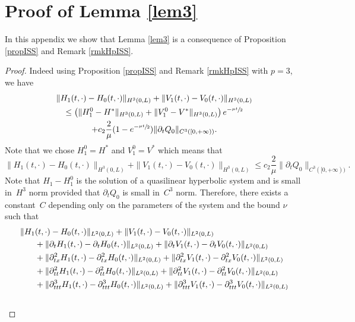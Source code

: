 \documentclass[11pt]{article}
\numberwithin{equation}{section}
\theoremstyle{definition}
\begin{document}
\section{Proof of Lemma \ref{lem3}}\label{app:prooflem3}
In this appendix we show that Lemma \ref{lem3} is a consequence of Proposition \ref{propISS} and Remark \ref{rmkHpISS}.
\begin{proof}
Indeed using Proposition \ref{propISS} and Remark \ref{rmkHpISS} with $p=3$, we have
\begin{multline*}
\|H_{1}(t,\cdot)-H_{0}(t,\cdot)\|_{H^{3}(0,L)}+\|V_{1}(t,\cdot)-V_{0}(t,\cdot)\|_{H^{3}(0,L)}\\
\leq \left(\|H_{1}^{0}-H^{*}\|_{H^{3}(0,L)}+\|V_{1}^{0}-V^{*}\|_{H^{3}(0,L)}\right)e^{-\sfrac{\mu t}{2}}\\
+c_{2} \frac{2}{\mu}(1-e^{-\sfrac{\mu t}{2}}) \|\partial_{t}Q_{0}\|_{C^{3}([0,+\infty))}.
\end{multline*}
Note that we chose $H_{1}^{0} = H^{*}$ and $V_{1}^{0} = V^{*}$ which means that
\begin{equation}\label{estimlemma1}
\|H_{1}(t,\cdot)-H_{0}(t,\cdot)\|_{H^{3}(0,L)}+\|V_{1}(t,\cdot)-V_{0}(t,\cdot)\|_{H^{3}(0,L)}\leq c_{2} \frac{2}{\mu}\|\partial_{t}Q_{0}\|_{C^{3}([0,+\infty))}.
\end{equation}
Note that $H_{1}-H_{1}^{0}$ is the solution of a quasilinear hyperbolic system and is small in~$H^{3}$ norm provided that $\partial_{t}Q_{0}$ is small in~$C^{3}$ norm. Therefore, there exists a constant~$C$ depending only on the parameters of the system and the bound $\nu$ such that
\begin{align}
\label{estimlemma2}
\|H_{1}&(t,\cdot)-H_{0}(t,\cdot)\|_{L^{2}(0,L)}+\|V_{1}(t,\cdot)-V_{0}(t,\cdot)\|_{L^{2}(0,L)}\\\notag
&+\|\partial_{t}H_{1}(t,\cdot)-\partial_{t}H_{0}(t,\cdot)\|_{L^{2}(0,L)}+\|\partial_{t}V_{1}(t,\cdot)-\partial_{t}V_{0}(t,\cdot)\|_{L^{2}(0,L)}\\\notag
&+\|\partial_{tx}^{2}H_{1}(t,\cdot)-\partial_{tx}^{2}H_{0}(t,\cdot)\|_{L^{2}(0,L)}+\|\partial_{tx}^{2}V_{1}(t,\cdot)-\partial_{tx}^{2}V_{0}(t,\cdot)\|_{L^{2}(0,L)}\\\notag
&+\|\partial_{tt}^{2}H_{1}(t,\cdot)-\partial_{tt}^{2}H_{0}(t,\cdot)\|_{L^{2}(0,L)}+\|\partial_{tt}^{2}V_{1}(t,\cdot)-\partial_{tt}^{2}V_{0}(t,\cdot)\|_{L^{2}(0,L)}\\\notag
&+\|\partial_{ttt}^{3}H_{1}(t,\cdot)-\partial_{ttt}^{3}H_{0}(t,\cdot)\|_{L^{2}(0,L)}+\|\partial_{ttt}^{3}V_{1}(t,\cdot)-\partial_{ttt}^{3}V_{0}(t,\cdot)\|_{L^{2}(0,L)}\\\notag

\end{align}
\end{proof}
\end{document}
